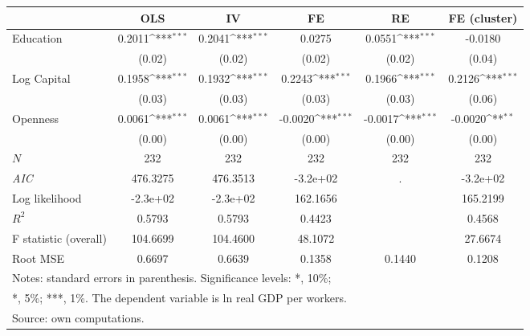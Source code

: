 {
\def\sym#1{\ifmmode^{#1}\else\(^{#1}\)\fi}
\begin{tabular}{l*{5}{c}}
\hline\hline
            &\multicolumn{1}{c}{OLS}&\multicolumn{1}{c}{IV}&\multicolumn{1}{c}{FE}&\multicolumn{1}{c}{RE}&\multicolumn{1}{c}{FE (cluster)}\\
\hline
Education   &      0.2011\sym{***}&      0.2041\sym{***}&      0.0275         &      0.0551\sym{***}&     -0.0180         \\
            &      (0.02)         &      (0.02)         &      (0.02)         &      (0.02)         &      (0.04)         \\
[1em]
Log Capital &      0.1958\sym{***}&      0.1932\sym{***}&      0.2243\sym{***}&      0.1966\sym{***}&      0.2126\sym{***}\\
            &      (0.03)         &      (0.03)         &      (0.03)         &      (0.03)         &      (0.06)         \\
[1em]
Openness    &      0.0061\sym{***}&      0.0061\sym{***}&     -0.0020\sym{***}&     -0.0017\sym{***}&     -0.0020\sym{**} \\
            &      (0.00)         &      (0.00)         &      (0.00)         &      (0.00)         &      (0.00)         \\
\hline
\(N\)       &         232         &         232         &         232         &         232         &         232         \\
\textit{AIC}&    476.3275         &    476.3513         &    -3.2e+02         &           .         &    -3.2e+02         \\
Log likelihood&    -2.3e+02         &    -2.3e+02         &    162.1656         &                     &    165.2199         \\
$R^{2}$     &      0.5793         &      0.5793         &      0.4423         &                     &      0.4568         \\
F statistic (overall)&    104.6699         &    104.4600         &     48.1072         &                     &     27.6674         \\
Root MSE    &      0.6697         &      0.6639         &      0.1358         &      0.1440         &      0.1208         \\
\hline\hline
\multicolumn{6}{l}{\footnotesize Notes: standard errors in parenthesis. Significance levels: *, 10\%;}\\
\multicolumn{6}{l}{\footnotesize **, 5\%; ***, 1\%. The dependent variable is ln real GDP per workers.}\\
\multicolumn{6}{l}{\footnotesize Source: own computations.}\\
\end{tabular}
}

